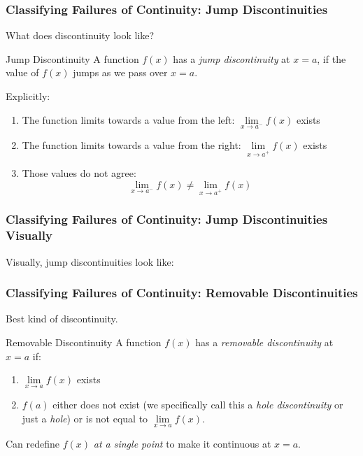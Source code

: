 \documentclass{ltx-talk}
\begin{document}
\begin{frame}
  \frametitle{Classifying Failures of Continuity: Jump Discontinuities}
  What does discontinuity look like?

  \begin{block}{Jump Discontinuity}
    A function $f(x)$ has a \textit{jump discontinuity} at $x = a$,
    \pause if the value of $f(x)$ jumps as we pass over $x = a$. \pause

    Explicitly: \pause
    \begin{enumerate}
      \item The function limits towards a value from the left: \pause
        $\lim\limits_{x \rightarrow a^{-}} f(x)$ exists \pause
      \item The function limits towards a value from the right: \pause
        $\lim\limits_{x \rightarrow a^{+}} f(x)$ exists \pause
      \item Those values do not agree: \pause
        \begin{equation}
          \lim\limits_{x \rightarrow a^{-}} f(x) \neq \lim\limits_{x \rightarrow a^{+}} f(x)
        \end{equation}
    \end{enumerate}
  \end{block}
\end{frame}

\begin{frame}
  \frametitle{Classifying Failures of Continuity: Jump Discontinuities Visually}

  Visually, jump discontinuities look like:
  \vfill
\end{frame}

\begin{frame}
  \frametitle{Classifying Failures of Continuity: Removable Discontinuities}
  Best kind of discontinuity. \pause
  \begin{block}{Removable Discontinuity}
    A function $f(x)$ has a \textit{removable discontinuity} at $x = a$ if: \pause
    \begin{enumerate}
      \item $\lim\limits_{x \rightarrow a} f(x)$ exists \pause
      \item $f(a)$ either does not exist \pause (we specifically call this a \textit{hole discontinuity} or just a \textit{hole}) \pause or is not equal to $\lim\limits_{x \rightarrow a} f(x)$.
    \end{enumerate}
  \end{block} \pause

  Can redefine $f(x)$ \textit{at a single point} to make it continuous at $x = a$.
\end{frame}
\end{document}

